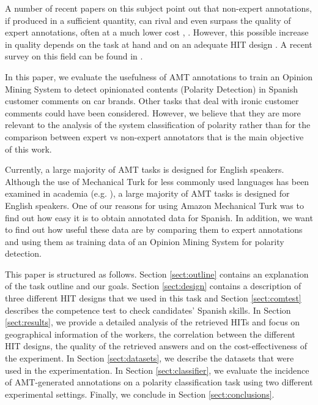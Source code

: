 \documentclass[11pt]{elsarticle}
\begin{document}
A number of recent papers on this subject point out that non-expert annotations, if produced in a sufficient quantity, can rival and even surpass the quality of expert annotations, often at a much lower cost \cite{snow_cheap_2008}, \cite{su_internet-scale_2007}. However, this possible increase in quality depends on the task at hand and on an adequate HIT design \cite{kittur_crowdsourcing_2008}. A recent survey on this field can be found in \cite{YuenKL11}.


In this paper, we evaluate the usefulness of AMT annotations to train an Opinion Mining System to detect opinionated contents (Polarity Detection) in Spanish customer comments on car brands. Other tasks that deal with ironic customer comments \cite{Reyes:2012,Filatova:2012,Bonev:2012} could have been considered. However, we believe that they are more relevant to the analysis of the system classification of polarity rather than for the comparison between expert vs non-expert annotators that is the main objective of this work. %

Currently, a large majority of AMT tasks is designed for English speakers. Although the use of Mechanical Turk for less commonly used languages has been examined in academia (e.g. \cite{irvine-klementiev:2010:MTURK}), a large majority of AMT tasks is designed for English speakers. One of our reasons for using Amazon Mechanical Turk was to find out how easy it is to obtain annotated data for Spanish. In addition, we want to find out how useful these data are by comparing them to expert annotations and using them as training data of an Opinion Mining System for polarity detection.

This paper is structured as follows. Section \ref{sect:outline} contains an explanation of the task outline and our goals. Section \ref{sect:design} contains a description of three different HIT designs that we used in this task and Section \ref{sect:comtest} describes the competence test to check candidates' Spanish skills. In Section \ref{sect:results}, we provide a detailed analysis of the retrieved HITs and focus on geographical information of the workers, the correlation between the different HIT designs, the quality of the retrieved answers and on the cost-effectiveness of the experiment. In Section \ref{sect:datasets}, we describe the datasets that were used in the experimentation. In Section \ref{sect:classifier}, we evaluate the incidence of AMT-generated annotations on a polarity classification task using two different experimental settings. Finally, we conclude in Section \ref{sect:conclusions}.
\end{document}
